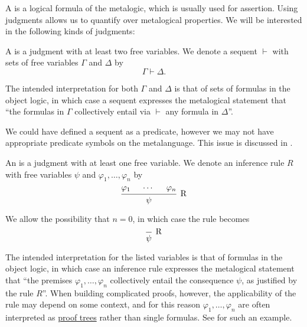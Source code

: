 \begin{definition}\label{def:judgment}\mimprovised
  A  is a logical formula of the metalogic, which is usually used for assertion. Using judgments allows us to quantify over metalogical properties. We will be interested in the following kinds of judgments:

  \begin{thmenum}
     A  is a judgment with at least two free variables. We denote a sequent \( \vdash \) with sets of free variables \( \Gamma \) and \( \Delta \) by
    \begin{equation*}
      \Gamma \vdash \Delta.
    \end{equation*}

    The intended interpretation for both \( \Gamma \) and \( \Delta \) is that of sets of formulas in the object logic, in which case a sequent expresses the metalogical statement that \enquote{the formulas in \( \Gamma \) collectively entail via \( \vdash \) any formula in \( \Delta \)}.

    We could have defined a sequent as a predicate, however we may not have appropriate predicate symbols on the metalanguage. This issue is discussed in .

     An  is a judgment with at least one free variable. We denote an inference rule \( R \) with free variables \( \psi \) and \( \varphi_1, \ldots, \varphi_n \) by
    \begin{equation*}
      \begin{prooftree}
        \hypo{ \varphi_1 }
        \hypo{ \cdots }
        \hypo{ \varphi_n }
        \infer3[R]{ \psi }
      \end{prooftree}
    \end{equation*}

    We allow the possibility that \( n = 0 \), in which case the rule becomes
    \begin{equation*}
      \begin{prooftree}
        \infer0[R]{ \psi }
      \end{prooftree}
    \end{equation*}

    The intended interpretation for the listed variables is that of formulas in the object logic, in which case an inference rule expresses the metalogical statement that \enquote{the premises \( \varphi_1, \ldots, \varphi_n \) collectively entail the consequence \( \psi \), as justified by the rule \( R \)}. When building complicated proofs, however, the applicability of the rule may depend on some context, and for this reason \( \varphi_1, \ldots, \varphi_n \) are often interpreted as \hyperref[def:proof_tree]{proof trees} rather than single formulas. See  for such an example.
  \end{thmenum}
\end{definition}

